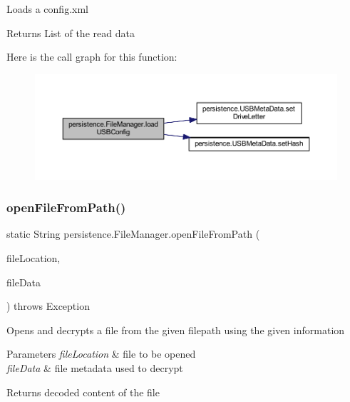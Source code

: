 Loads a config.\+xml \begin{DoxyReturn}{Returns}
List of the read data 
\end{DoxyReturn}
Here is the call graph for this function\+:\nopagebreak
\begin{figure}[H]
\begin{center}
\leavevmode
\includegraphics[width=350pt]{classpersistence_1_1_file_manager_a5cc9f22a6f81dbba2ff9cbffd9e0c250_cgraph}
\end{center}
\end{figure}
\mbox{\label{classpersistence_1_1_file_manager_adfbb7817aa088a174d2a78be57462e71}} 
\subsubsection{\texorpdfstring{open\+File\+From\+Path()}{openFileFromPath()}}
{\footnotesize\ttfamily static String persistence.\+File\+Manager.\+open\+File\+From\+Path (\begin{DoxyParamCaption}\item[{String}]{file\+Location,  }\item[{\mbox{\hyperlink{classpersistence_1_1_meta_data}{Meta\+Data}}}]{file\+Data }\end{DoxyParamCaption}) throws Exception\hspace{0.3cm}{\ttfamily [static]}}

Opens and decrypts a file from the given filepath using the given information 
\begin{DoxyParams}{Parameters}
{\em file\+Location} & file to be opened \\
\hline
{\em file\+Data} & file metadata used to decrypt \\
\hline
\end{DoxyParams}
\begin{DoxyReturn}{Returns}
decoded content of the file 
\end{DoxyReturn}

